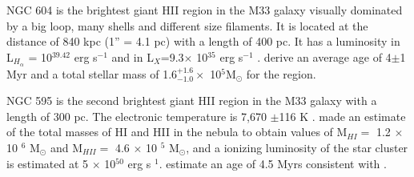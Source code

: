 \documentclass[fleqn,usenatbib]{mnras}
\begin{document}

NGC 604 is the brightest giant HII region in the M33 galaxy visually dominated by a big loop, many shells and different size filaments. It is located at the distance of 840 kpc (1'' = 4.1 pc) \citep{2015KamKinematics} with a length of 400 pc. It has a luminosity in L$_{H_\alpha}$ = 10$^{39.42}$ erg s$^{-1}$ \citep{2002MNRAS.329..481B} and in L$_{X}$=9.3$\times$ 10$^{35}$ erg s$^{-1}$ \citep{2008ApJ...685..919T}. \cite{2012ApJ...761....3M} derive an average age of 4$\pm$1 Myr and a total stellar mass of 1.6$^{+1.6}_{-1.0} \times$ 10$^{5}$M$_{\odot}$ for the region.


NGC 595 is the second brightest giant HII region in the M33 galaxy with a length of 300 pc. The electronic temperature is 7,670 $\pm$116 K \citep{2010MNRAS.402.1635R}. \cite{1983A&A...119..185V} made an estimate of the total masses of HI and HII in the nebula to obtain values of M$_{HI}=$ 1.2 $\times$ 10 $^{6}$ M$_{\odot}$ and M$_{HII} =$ 4.6 $\times$ 10 $^{5}$ M$_{\odot}$, and a ionizing luminosity of the star cluster is estimated at 5 $\times$ 10$^{50}$ erg s $^{1}$. \cite{1996AJ....111.1128M} estimate an age of 4.5 Myrs consistent with \cite{1993AJ....105.1400D}. 
\end{document}

